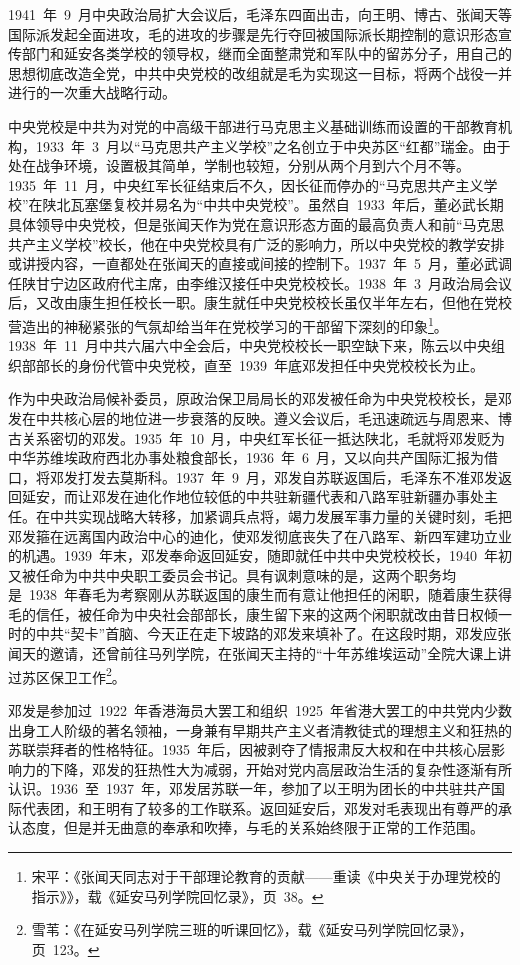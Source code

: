 1941~年~9~月中央政治局扩大会议后，毛泽东四面出击，向王明、博古、张闻天等国际派发起全面进攻，毛的进攻的步骤是先行夺回被国际派长期控制的意识形态宣传部门和延安各类学校的领导权，继而全面整肃党和军队中的留苏分子，用自己的思想彻底改造全党，中共中央党校的改组就是毛为实现这一目标，将两个战役一并进行的一次重大战略行动。

中央党校是中共为对党的中高级干部进行马克思主义基础训练而设置的干部教育机构，1933~年~3~月以“马克思共产主义学校”之名创立于中央苏区“红都”瑞金。由于处在战争环境，设置极其简单，学制也较短，分别从两个月到六个月不等。1935~年~11~月，中央红军长征结束后不久，因长征而停办的“马克思共产主义学校”在陕北瓦塞堡复校并易名为“中共中央党校”。虽然自~1933~年后，董必武长期具体领导中央党校，但是张闻天作为党在意识形态方面的最高负责人和前“马克思共产主义学校”校长，他在中央党校具有广泛的影响力，所以中央党校的教学安排或讲授内容，一直都处在张闻天的直接或间接的控制下。1937~年~5~月，董必武调任陕甘宁边区政府代主席，由李维汉接任中央党校校长。1938~年~3~月政治局会议后，又改由康生担任校长一职。康生就任中央党校校长虽仅半年左右，但他在党校营造出的神秘紧张的气氛却给当年在党校学习的干部留下深刻的印象\footnote{宋平：《张闻天同志对于干部理论教育的贡献——重读《中央关于办理党校的指示》》，载《延安马列学院回忆录》，页~38。}。1938~年~11~月中共六届六中全会后，中央党校校长一职空缺下来，陈云以中央组织部部长的身份代管中央党校，直至~1939~年底邓发担任中央党校校长为止。

作为中央政治局候补委员，原政治保卫局局长的邓发被任命为中央党校校长，是邓发在中共核心层的地位进一步衰落的反映。遵义会议后，毛迅速疏远与周恩来、博古关系密切的邓发。1935~年~10~月，中央红军长征一抵达陕北，毛就将邓发贬为中华苏维埃政府西北办事处粮食部长，1936~年~6~月，又以向共产国际汇报为借口，将邓发打发去莫斯科。1937~年~9~月，邓发自苏联返国后，毛泽东不准邓发返回延安，而让邓发在迪化作地位较低的中共驻新疆代表和八路军驻新疆办事处主任。在中共实现战略大转移，加紧调兵点将，竭力发展军事力量的关键时刻，毛把邓发箍在远离国内政治中心的迪化，使邓发彻底丧失了在八路军、新四军建功立业的机遇。1939~年末，邓发奉命返回延安，随即就任中共中央党校校长，1940~年初又被任命为中共中央职工委员会书记。具有讽刺意味的是，这两个职务均是~1938~年春毛为考察刚从苏联返国的康生而有意让他担任的闲职，随着康生获得毛的信任，被任命为中央社会部部长，康生留下来的这两个闲职就改由昔日权倾一时的中共“契卡”首脑、今天正在走下坡路的邓发来填补了。在这段时期，邓发应张闻天的邀请，还曾前往马列学院，在张闻天主持的“十年苏维埃运动”全院大课上讲过苏区保卫工作\footnote{雪苇：《在延安马列学院三班的听课回忆》，载《延安马列学院回忆录》，页~123。}。

邓发是参加过~1922~年香港海员大罢工和组织~1925~年省港大罢工的中共党内少数出身工人阶级的著名领袖，一身兼有早期共产主义者清教徒式的理想主义和狂热的苏联崇拜者的性格特征。1935~年后，因被剥夺了情报肃反大权和在中共核心层影响力的下降，邓发的狂热性大为减弱，开始对党内高层政治生活的复杂性逐渐有所认识。1936~至~1937~年，邓发居苏联一年，参加了以王明为团长的中共驻共产国际代表团，和王明有了较多的工作联系。返回延安后，邓发对毛表现出有尊严的承认态度，但是并无曲意的奉承和吹捧，与毛的关系始终限于正常的工作范围。

